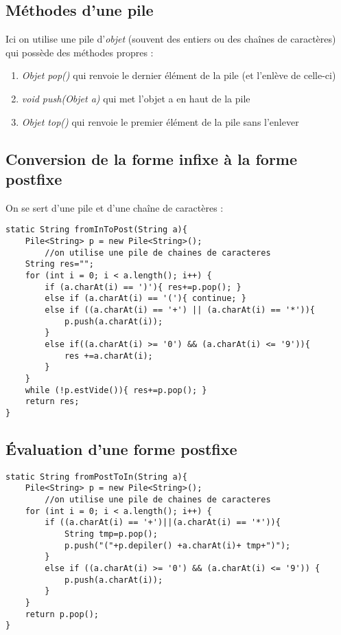 \documentclass[a4paper,10pt]{book} %
\begin{document}
\subsection{Méthodes d'une pile}
Ici on utilise une pile d'\textit{objet} (souvent des entiers ou des chaînes de caractères) qui possède des méthodes propres : 
\begin{enumerate}
\item \textit{Objet pop()} qui renvoie le dernier élément de la pile (et l'enlève de celle-ci)
\item \textit{void push(Objet a)} qui met l'objet a en haut de la pile
\item \textit{Objet top()} qui renvoie le premier élément de la pile sans l'enlever
\end{enumerate}

\subsection{Conversion de la forme infixe à la forme postfixe}
On se sert d'une pile et d'une chaîne de caractères :
\begin{lstlisting}
static String fromInToPost(String a){
    Pile<String> p = new Pile<String>();
    	//on utilise une pile de chaines de caracteres
    String res="";
    for (int i = 0; i < a.length(); i++) {
        if (a.charAt(i) == ')'){ res+=p.pop(); }
        else if (a.charAt(i) == '('){ continue; }
        else if ((a.charAt(i) == '+') || (a.charAt(i) == '*')){
            p.push(a.charAt(i));
        }
        else if((a.charAt(i) >= '0') && (a.charAt(i) <= '9')){
            res +=a.charAt(i);
        }
    }
    while (!p.estVide()){ res+=p.pop(); }
  	return res;
}
\end{lstlisting}

\subsection{Évaluation d'une forme postfixe}

\begin{lstlisting}
static String fromPostToIn(String a){
	Pile<String> p = new Pile<String>();
		//on utilise une pile de chaines de caracteres
	for (int i = 0; i < a.length(); i++) {
	    if ((a.charAt(i) == '+')||(a.charAt(i) == '*')){
	        String tmp=p.pop();
	        p.push("("+p.depiler() +a.charAt(i)+ tmp+")");
	    }
	    else if ((a.charAt(i) >= '0') && (a.charAt(i) <= '9')) {
	        p.push(a.charAt(i));
	    }
	}
	return p.pop();
}
\end{lstlisting}
\end{document}

